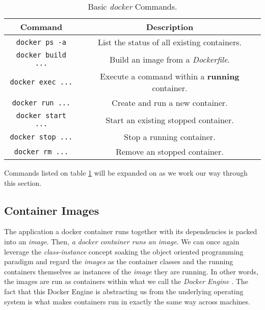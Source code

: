             \begin{table}
                \centering
                \begin{tabular}{|c|c|}
                    \hline
                    \textbf{Command} & \textbf{Description}\\
                    \hline
                    \texttt{docker ps -a} & List the status of all existing containers.\\
                    \hline
                    \texttt{docker build ...} & Build an image from a \textit{Dockerfile}.\\
                    \hline
                    \texttt{docker exec ...} & Execute a command within a \textbf{running} container.\\
                    \hline
                    \texttt{docker run ...} & Create and run a new container.\\
                    \hline
                    \texttt{docker start ...} & Start an existing stopped container.\\
                    \hline
                    \texttt{docker stop ...} & Stop a running container.\\
                    \hline
                    \texttt{docker rm ...} & Remove an stopped container.\\
                    \hline
                \end{tabular}
                \caption{Basic \textit{docker} Commands.}
                \label{tab:docker-commands}
            \end{table}

            Commands listed on table \ref{tab:docker-commands} will be expanded on as we work our way through this section.\\

        \subsection{Container Images}
            The application a docker container runs together with its dependencies is packed into an \textit{image}. Then, \textit{a docker container runs an image}. We can once again leverage the \textit{class-instance} concept soaking the object oriented programming paradigm and regard the \textit{images} as the container classes and the running containers themselves as instances of the \textit{image} they are running. In other words, the images are run as containers within what we call the \textit{Docker Engine} \cite{bib:docker-engine}. The fact that this Docker Engine is abstracting us from the underlying operating system is what makes containers run in exactly the same way across machines.\\

